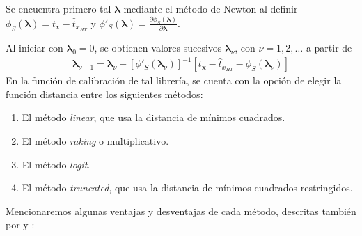 \documentclass[a4paper,twoside,openright,12pt]{book}
\theoremstyle{definition}
\numberwithin{equation}{chapter}
\numberwithin{figure}{chapter}
\numberwithin{table}{chapter}
\numberwithin{theorem}{chapter}
\numberwithin{lemma}{chapter}
\begin{document}
Se encuentra primero tal $\mathbf{\lambda}$ mediante el método de Newton al definir $\phi_S(\mathbf{\lambda})=t_{\mathbf{x}}-\hat t_{x_{HT}}$ y $\phi'_S(\mathbf{\lambda})=\frac{\partial \phi_S(\mathbf{\lambda})}{\partial \mathbf{\lambda}}$.

Al iniciar con $\mathbf{\lambda}_0=0$, se obtienen valores sucesivos $\mathbf{\lambda}_\nu$, con $\nu=1,2,\ldots$ a partir de
\begin{align}\label{eqn:8.7}
\mathbf{\lambda}_{\nu+1}=\mathbf{\lambda}_\nu+\left[\phi'_S(\mathbf{\lambda}_\nu)\right]^{-1}\left[t_{\mathbf{x}}-\hat t_{x_{HT}}-\phi_S(\mathbf{\lambda}_\nu)\right]
\end{align}
En la función de calibración de tal librería, se cuenta con la opción de elegir la función distancia entre los siguientes métodos:
\begin{enumerate}\label{distancias}
	\item El método \textsl{linear}, que usa la distancia de mínimos cuadrados.
	\item El método \textsl{raking} o multiplicativo.
	\item El método \textsl{logit}.
	\item El método \textsl{truncated}, que usa la distancia de mínimos cuadrados restringidos.
\end{enumerate}
Mencionaremos algunas ventajas y desventajas de cada método, descritas también por \cite{CIS-241424} y \cite{CIS-112732}:
\end{document}

